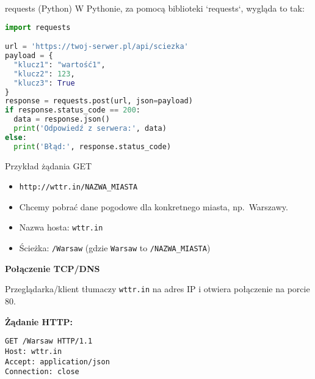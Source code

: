 \documentclass[10pt,compress,usenames,dvipsnames,aspectratio=169]{beamer}
\begin{document}
\begin{frame}[fragile]{requests (Python)}
W Pythonie, za pomocą biblioteki `requests`, wygląda to tak:

  \begin{lstlisting}[style=dark, language=Python, basicstyle=\ttfamily\scriptsize\color{fgcode}, numbers=none, xleftmargin=1em, xrightmargin=1em]
import requests

url = 'https://twoj-serwer.pl/api/sciezka'
payload = {
  "klucz1": "wartość1",
  "klucz2": 123,
  "klucz3": True
}
response = requests.post(url, json=payload)
if response.status_code == 200:
  data = response.json()
  print('Odpowiedź z serwera:', data)
else:
  print('Błąd:', response.status_code)
  \end{lstlisting}
  
\end{frame}

\begin{frame}[fragile]{Przykład żądania GET}
  \begin{itemize}
    \item \texttt{http://wttr.in/NAZWA\_MIASTA}
    \item Chcemy pobrać dane pogodowe dla konkretnego miasta, np.\ Warszawy.
    \item Nazwa hosta: \texttt{wttr.in}
    \item Ścieżka: \texttt{/Warsaw} (gdzie \texttt{Warsaw} to \texttt{/NAZWA\_MIASTA})
  \end{itemize}

  \vspace{1ex}
  \textbf{Połączenie TCP/DNS}

  Przeglądarka/klient tłumaczy \texttt{wttr.in} na adres IP i otwiera połączenie na porcie 80.

  \vspace{1ex}
  \textbf{Żądanie HTTP:}
  \begin{center}
    \begin{minipage}{0.5\textwidth}
      \begin{lstlisting}[style=dark, basicstyle=\ttfamily\scriptsize\color{fgcode}, numbers=none, xleftmargin=1em, xrightmargin=1em]
GET /Warsaw HTTP/1.1
Host: wttr.in
Accept: application/json
Connection: close
      \end{lstlisting}
    \end{minipage}
  \end{center}

\end{frame}
\end{document}
